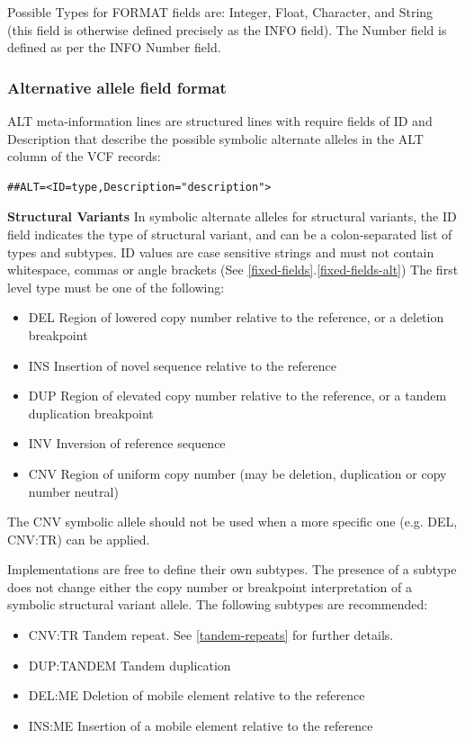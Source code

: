 \documentclass[8pt]{article}
\begin{document}
Possible Types for FORMAT fields are: Integer, Float, Character, and String (this field is otherwise defined precisely as the INFO field).
The Number field is defined as per the INFO Number field.

\subsubsection{Alternative allele field format} \label{altfield}
ALT meta-information lines are structured lines with require fields of ID and Description that describe the possible symbolic alternate alleles in the ALT column of the VCF records:

\begin{verbatim}
##ALT=<ID=type,Description="description">
\end{verbatim}

\noindent \textbf{Structural Variants} \newline
In symbolic alternate alleles for structural variants, the ID field indicates the type of structural variant, and can be a colon-separated list of types and subtypes.
ID values are case sensitive strings and must not contain whitespace, commas or angle brackets (See \ref{fixed-fields}.\ref{fixed-fields-alt})
The first level type must be one of the following:
\begin{itemize}
  \item DEL Region of lowered copy number relative to the reference, or a deletion breakpoint
  \item INS Insertion of novel sequence relative to the reference
  \item DUP Region of elevated copy number relative to the reference, or a tandem duplication breakpoint
  \item INV Inversion of reference sequence
  \item CNV Region of uniform copy number (may be deletion, duplication or copy number neutral)
\end{itemize}

The CNV symbolic allele should not be used when a more specific one (e.g. DEL, CNV:TR) can be applied.

Implementations are free to define their own subtypes.
The presence of a subtype does not change either the copy number or breakpoint interpretation of a symbolic structural variant allele.
The following subtypes are recommended:
\begin{itemize}
  \item CNV:TR Tandem repeat. See \ref{tandem-repeats} for further details.
  \item DUP:TANDEM Tandem duplication
  \item DEL:ME Deletion of mobile element relative to the reference
  \item INS:ME Insertion of a mobile element relative to the reference
\end{itemize}
\end{document}
